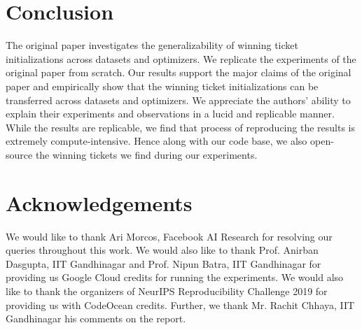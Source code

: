     
    
    \section{Conclusion}
    The original paper \cite{repro_paper} investigates the generalizability of winning ticket initializations across datasets and optimizers. We replicate the experiments of the original paper from scratch. Our results support the major claims of the original paper and empirically show that the winning ticket initializations can be transferred across datasets and optimizers. We appreciate the authors' ability to explain their experiments and observations in a lucid and replicable manner. While the results are replicable, we find that process of reproducing the results is extremely compute-intensive. Hence along with our code base, we also open-source the winning tickets we find during our experiments.
    
    
    \section{Acknowledgements}
    We would like to thank Ari Morcos, Facebook AI Research for resolving our queries throughout this work. We would also like to thank Prof. Anirban Dasgupta, IIT Gandhinagar and Prof. Nipun Batra, IIT Gandhinagar for providing us Google Cloud credits for running the experiments. We would also like to thank the organizers of NeurIPS Reproducibility Challenge 2019 for providing us with CodeOcean credits. Further, we thank Mr. Rachit Chhaya, IIT Gandhinagar his comments on the report.
    
